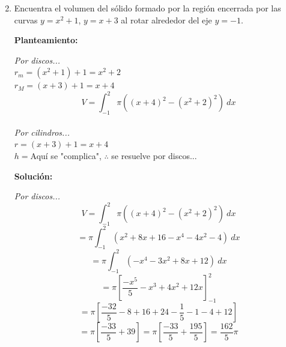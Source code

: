 \documentclass[10pt,letterpaper]{article}
\begin{document}
\begin{enumerate}
\begin{multicols}{2}
\end{multicols}

\item Encuentra el volumen del sólido formado por la región encerrada por las curvas $y=x^2 +1$,
      $y=x+3$ al rotar alrededor del eje $y = -1$.

\begin{multicols}{2}


\textbf{Planteamiento:}

\textit{Por discos...} \\
$r_m = (x^2 + 1) + 1 = x^2 + 2$ \\
$r_M = (x + 3) + 1 = x + 4$
$$V = \int_{-1}^{2} \pi ( (x+4)^2 - (x^2 + 2)^2 ) \ dx$$\\

\textit{Por cilindros...} \\
$r = (x+3)+1 = x+4$ \\
$h = $Aquí se "complica", $\therefore$ se resuelve por discos...

\textbf{Solución:}

\textit{Por discos...}
$$V = \int_{-1}^{2} \pi ( (x+4)^2 - (x^2 + 2)^2 ) \ dx$$
$$= \pi \int_{-1}^{2} (x^2 + 8x + 16 - x^4 - 4x^2 -4) \ dx$$
$$= \pi \int_{-1}^{2} (-x^4 -3x^2 + 8x + 12)\ dx$$
$$= \pi [\frac{-x^5}{5} - x^3 + 4x^2 + 12x]_{-1}^{2}$$
$$= \pi [\frac{-32}{5} - 8 + 16 + 24 - \frac{1}{5} - 1 - 4  + 12]$$
$$= \pi [\frac{-33}{5}+39] = \pi [\frac{-33}{5} + \frac{195}{5}] = \frac{162}{5}\pi$$


\end{multicols}
\end{enumerate}
\end{document}
